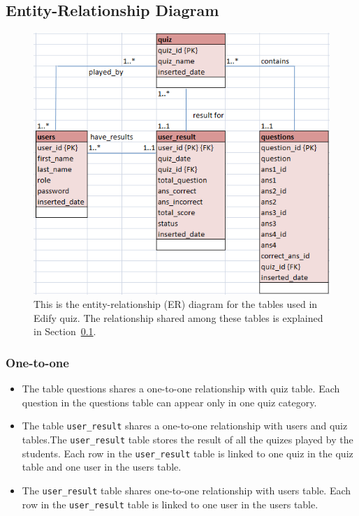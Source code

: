 \subsection{Entity-Relationship Diagram}
\label{sub:entity_relationship_diagram}

\begin{figure}[htpb]
	\centering
	\includegraphics[width=0.8\linewidth]{img/Entity_Relationship_Diagram.png}
	\caption{This is the entity-relationship (ER) diagram for the tables used
	in Edify quiz.  The relationship shared among these tables is explained in
	Section~\ref{sub:entity_relationship_diagram}.
	}\label{fig:entity_relationship_diagram}
\end{figure}

\subsubsection{One-to-one}
\label{ssub:One-to-one}
\begin{itemize}

	\item The table questions shares a one-to-one relationship with quiz table.
		Each question in the questions table can appear only in one quiz
		category.

	\item The table \verb+user_result+ shares a one-to-one relationship with
		users and quiz tables.The \verb+user_result+ table stores the result of
		all the quizes played by the students. Each row in the
		\verb+user_result+ table is linked to one quiz in the quiz table and
		one user in the users table.

	\item The \verb+user_result+ table shares one-to-one relationship with
		users table. Each row in the \verb+user_result+ table is linked to one
		user in the users table.

\end{itemize}

